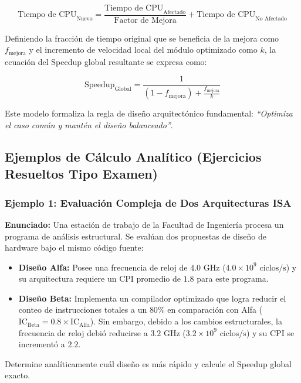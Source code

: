 \documentclass[12pt,letterpaper]{article}
\begin{document}
\begin{equation}
\text{Tiempo de CPU}_{\text{Nuevo}} = \frac{\text{Tiempo de CPU}_{\text{Afectado}}}{\text{Factor de Mejora}} + \text{Tiempo de CPU}_{\text{No Afectado}}
\end{equation}

Definiendo la fracción de tiempo original que se beneficia de la mejora como $f_{\text{mejora}}$ y el incremento de velocidad local del módulo optimizado como $k$, la ecuación del Speedup global resultante se expresa como:

\begin{equation}
\text{Speedup}_{\text{Global}} = \frac{1}{(1 - f_{\text{mejora}}) + \frac{f_{\text{mejora}}}{k}}
\end{equation}

Este modelo formaliza la regla de diseño arquitectónico fundamental: \textit{``Optimiza el caso común y mantén el diseño balanceado''}.

\newpage

\subsection{Ejemplos de Cálculo Analítico (Ejercicios Resueltos Tipo Examen)}

\subsubsection{Ejemplo 1: Evaluación Compleja de Dos Arquitecturas ISA}
\textbf{Enunciado:} Una estación de trabajo de la Facultad de Ingeniería procesa un programa de análisis estructural. Se evalúan dos propuestas de diseño de hardware bajo el mismo código fuente:
\begin{itemize}
    \item \textbf{Diseño Alfa:} Posee una frecuencia de reloj de $4.0\text{ GHz}$ ($4.0 \times 10^9 \text{ ciclos}/\text{s}$) y su arquitectura requiere un $\text{CPI}$ promedio de $1.8$ para este programa.
    \item \textbf{Diseño Beta:} Implementa un compilador optimizado que logra reducir el conteo de instrucciones totales a un $80\%$ en comparación con Alfa ($\text{IC}_{\text{Beta}} = 0.8 \times \text{IC}_{\text{Alfa}}$). Sin embargo, debido a los cambios estructurales, la frecuencia de reloj debió reducirse a $3.2\text{ GHz}$ ($3.2 \times 10^9 \text{ ciclos}/\text{s}$) y su $\text{CPI}$ se incrementó a $2.2$.
\end{itemize}
Determine analíticamente cuál diseño es más rápido y calcule el Speedup global exacto.
\end{document}
